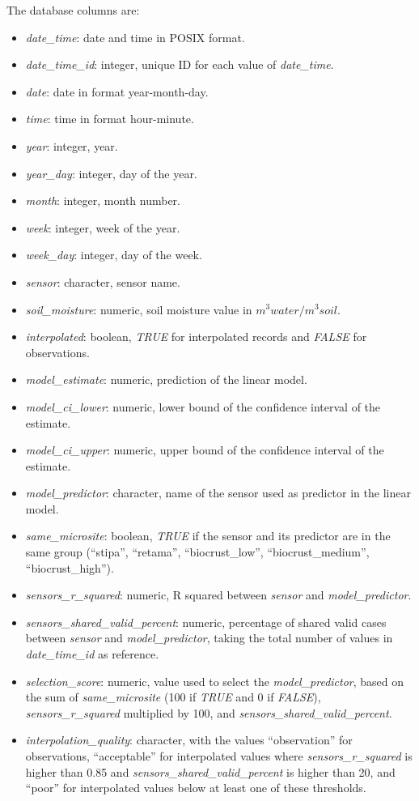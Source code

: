 \documentclass[]{article}
\providecommand{\tightlist}{%
  \setlength{\itemsep}{0pt}\setlength{\parskip}{0pt}}
\begin{document}
The database columns are:

\begin{itemize}
\tightlist
\item
  \emph{date\_time}: date and time in POSIX format.
\item
  \emph{date\_time\_id}: integer, unique ID for each value of
  \emph{date\_time}.
\item
  \emph{date}: date in format year-month-day.
\item
  \emph{time}: time in format hour-minute.
\item
  \emph{year}: integer, year.
\item
  \emph{year\_day}: integer, day of the year.
\item
  \emph{month}: integer, month number.
\item
  \emph{week}: integer, week of the year.
\item
  \emph{week\_day}: integer, day of the week.
\item
  \emph{sensor}: character, sensor name.
\item
  \emph{soil\_moisture}: numeric, soil moisture value in
  \(m^{3} water /m^{3} soil\).
\item
  \emph{interpolated}: boolean, \emph{TRUE} for interpolated records and
  \emph{FALSE} for observations.
\item
  \emph{model\_estimate}: numeric, prediction of the linear model.
\item
  \emph{model\_ci\_lower}: numeric, lower bound of the confidence
  interval of the estimate.
\item
  \emph{model\_ci\_upper}: numeric, upper bound of the confidence
  interval of the estimate.
\item
  \emph{model\_predictor}: character, name of the sensor used as
  predictor in the linear model.
\item
  \emph{same\_microsite}: boolean, \emph{TRUE} if the sensor and its
  predictor are in the same group (``stipa'', ``retama'',
  ``biocrust\_low'', ``biocrust\_medium'', ``biocrust\_high'').
\item
  \emph{sensors\_r\_squared}: numeric, R squared between \emph{sensor}
  and \emph{model\_predictor}.
\item
  \emph{sensors\_shared\_valid\_percent}: numeric, percentage of shared
  valid cases between \emph{sensor} and \emph{model\_predictor}, taking
  the total number of values in \emph{date\_time\_id} as reference.
\item
  \emph{selection\_score}: numeric, value used to select the
  \emph{model\_predictor}, based on the sum of \emph{same\_microsite}
  (100 if \emph{TRUE} and 0 if \emph{FALSE}), \emph{sensors\_r\_squared}
  multiplied by 100, and \emph{sensors\_shared\_valid\_percent}.
\item
  \emph{interpolation\_quality}: character, with the values
  ``observation'' for observations, ``acceptable'' for interpolated
  values where \emph{sensors\_r\_squared} is higher than 0.85 and
  \emph{sensors\_shared\_valid\_percent} is higher than 20, and ``poor''
  for interpolated values below at least one of these thresholds.
\end{itemize}
\end{document}
